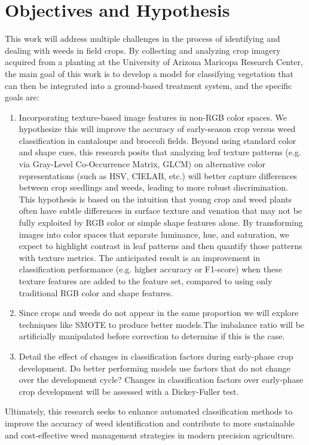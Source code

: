 \documentclass[letterpaper]{report}
\begin{document}
\section{Objectives and Hypothesis}
This work will address multiple challenges in the process of identifying and dealing with weeds in field crops. By collecting and analyzing crop imagery acquired from a planting at the University of Arizona Maricopa Research Center, the main goal of this work is to develop a model for classifying vegetation that can then be integrated into a ground-based treatment system, and the specific goals are:
\begin{enumerate}
	\item{Incorporating texture-based image features in non-RGB color spaces. We hypothesize this will improve the accuracy of early-season crop versus weed classification in cantaloupe and broccoli fields. Beyond using standard color and shape cues, this research posits that analyzing leaf texture patterns (e.g. via Gray-Level Co-Occurrence Matrix, GLCM) on alternative color representations (such as HSV, CIELAB, etc.) will better capture differences between crop seedlings and weeds, leading to more robust discrimination. This hypothesis is based on the intuition that young crop and weed plants often have subtle differences in surface texture and venation that may not be fully exploited by RGB color or simple shape features alone. By transforming images into color spaces that separate luminance, hue, and saturation, we expect to highlight contrast in leaf patterns and then quantify those patterns with texture metrics. The anticipated result is an improvement in classification performance (e.g. higher accuracy or F1-score) when these texture features are added to the feature set, compared to using only traditional RGB color and shape features.}
	\item{Since crops and weeds do not appear in the same proportion we will explore techniques like SMOTE to produce better models.The imbalance ratio will be artificially manipulated before correction to determine if this is the case.}
	\item{Detail the effect of changes in classification factors during early-phase crop development. Do better performing models use factors that do not change over the development cycle? Changes in classification factors over early-phase crop development will be assessed with a Dickey-Fuller test.}
\end{enumerate}
Ultimately, this research seeks to enhance automated classification methods to improve the accuracy of weed identification and contribute to more sustainable and cost-effective weed management strategies in modern precision agriculture.
\end{document}
